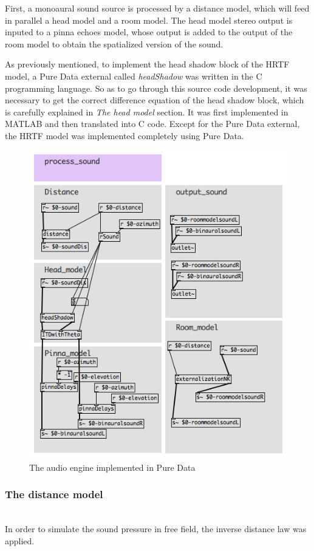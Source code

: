 \documentclass[journal]{IEEEtran}
\begin{document}
First, a monoaural sound source is processed by a distance model, which will feed in parallel a head model and a room model. The head model stereo output is inputed to a pinna echoes model, whose output is added to the output of the room model to obtain the spatialized version of the sound.

As previously mentioned, to implement the head shadow block of the HRTF model, a Pure Data external called \emph{headShadow} was written in the C programming language. So as to go through this source code development, it was necessary to get the correct difference equation of the head shadow block, which is carefully explained in \emph{The head model} section. It was first implemented in MATLAB and then translated into C code. Except for the Pure Data external, the HRTF model was implemented completely using Pure Data.

\begin{figure}[h!]
  \centering
    \includegraphics[scale=0.5]{graphics/audioengine.png}
  \caption{The audio engine implemented in Pure Data}
  \label{fig:augioengine}
\end{figure}

\subsubsection{The distance model}~\\
In order to simulate the sound pressure in free field, the inverse distance law was applied. 
\end{document}
